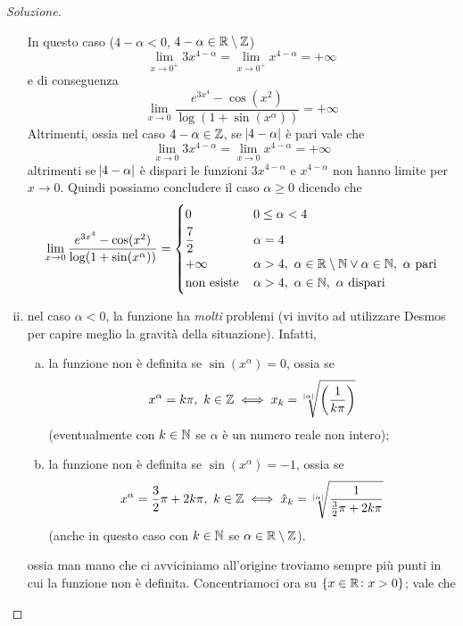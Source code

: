 \begin{proof}[Soluzione]
\begin{enumerate}[(i)]
        In questo caso ($4-\alpha<0$, $4-\alpha\in\amsbb{R}\setminus \amsbb{Z}$)
        \[
        \lim_{x\to 0^+} 3x^{4-\alpha} = \lim_{x\to 0^+} x^{4-\alpha} = +\infty
        \]
        e di conseguenza
        \[
        \lim_{x\to 0} \frac{e^{3x^4}-\cos(x^2)}{\log(1+\sin(x^\alpha))} = +\infty
        \]
        Altrimenti, ossia nel caso $4-\alpha\in\amsbb{Z}$, se $\abs{4-\alpha}$ è pari vale che
        \[
        \lim_{x\to 0} 3x^{4-\alpha} = \lim_{x\to 0} x^{4-\alpha} = +\infty
        \]
        altrimenti se $\abs{4-\alpha}$ è dispari le funzioni $3x^{4-\alpha}$ e $x^{4-\alpha}$ non hanno limite per $x\to 0$. Quindi possiamo concludere il caso $\alpha\ge 0$ dicendo che
        \[
        \lim_{x\to 0} \frac{e^{3x^4}-\cos(x^2)}{\log(1+\sin(x^\alpha))} = \begin{dcases}
            0\, & 0\le \alpha<4\\
            \frac{7}{2}\, & \alpha=4 \\
            +\infty\, & \alpha>4, \ \alpha\in\amsbb{R}\setminus \amsbb{N} \lor \alpha\in\amsbb{N}, \ \alpha \ \text{pari} \\
            \text{non esiste}\, & \alpha>4, \ \alpha\in\amsbb{N}, \ \alpha \ \text{dispari} 
        \end{dcases}
        \]
        \item nel caso $\alpha<0$, la funzione ha \emph{molti} problemi (vi invito ad utilizzare Desmos per capire meglio la gravità della situazione).
        Infatti,
        \begin{enumerate}[(a)]
            \item la funzione non è definita se $\sin(x^\alpha) = 0$, ossia se 
            \[
            x^{\alpha} = k\pi, \ k\in\amsbb{Z} \iff x_k = \sqrt[\abs{\alpha}]{\left(\frac{1}{k\pi}\right)}
            \]
            (eventualmente con $k\in\amsbb{N}$ se $\alpha$ è un numero reale non intero);
            \item la funzione non è definita se $\sin(x^\alpha)=-1$, ossia se
            \[
            x^\alpha = \frac{3}{2}\pi + 2k\pi, \ k\in\amsbb{Z} \iff \hat{x}_k =\sqrt[\abs{\alpha}]{\frac{1}{\frac{3}{2}\pi + 2k\pi}}
            \]
            (anche in questo caso con $k\in\amsbb{N}$ se $\alpha\in\amsbb{R}\setminus \amsbb{Z}$).
        \end{enumerate}
        ossia man mano che ci avviciniamo all'origine troviamo sempre più punti in cui la funzione non è definita. Concentriamoci ora su $\{x\in\amsbb{R}\colon x>0\}$; vale che
        \begin{enumerate}[(a)]

\end{enumerate}
\end{enumerate}
\end{proof}
